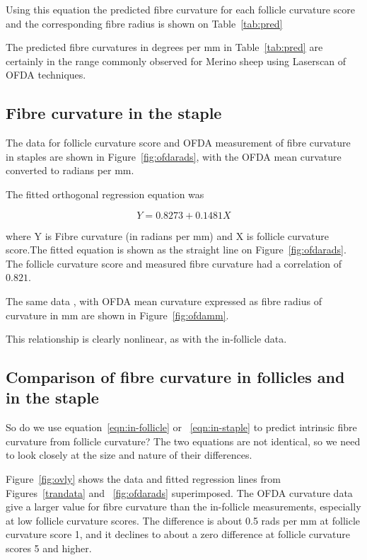\documentclass[titlepage]{article}  %
\begin{document}
Using this equation the predicted fibre curvature for each follicle curvature score and the corresponding fibre radius is shown on Table~\ref{tab:pred}


 
The predicted fibre curvatures in  degrees per mm in Table~\ref{tab:pred} are certainly in the range commonly observed for Merino sheep using Laserscan of OFDA techniques.

\subsection{Fibre curvature in the staple}
The data for follicle curvature score and OFDA measurement of fibre curvature in staples are shown in Figure~\ref{fig:ofdarads}, with the OFDA mean curvature converted to radians per mm. 



The fitted orthogonal regression equation was 

\begin{equation}
\label{eqn:in-staple}
Y = 0.8273 + 0.1481 X
\end{equation}

where Y is Fibre curvature (in radians per mm) and X is follicle curvature score.The fitted equation is shown as the straight line on Figure~\ref{fig:ofdarads}. The follicle curvature score and measured fibre curvature  had a correlation  of $0.821$.



The same data , with OFDA mean curvature expressed as fibre radius of curvature in mm are shown in Figure~\ref{fig:ofdamm}.



This relationship is clearly nonlinear, as with the in-follicle data.

\subsection{Comparison of fibre curvature in follicles and in the staple}
So do we use equation~\ref{eqn:in-follicle} or ~\ref{eqn:in-staple} to predict intrinsic fibre curvature from follicle curvature? The two equations are not identical, so we need to look closely at the size and nature of their differences.

Figure~\ref{fig:ovly} shows the data and fitted regression lines from Figures~\ref{trandata} and ~\ref{fig:ofdarads} superimposed. The OFDA curvature data give a larger value for fibre curvature than the in-follicle measurements, especially at low follicle curvature scores. The difference is about 0.5 rads per mm at follicle curvature score 1, and it declines to about a zero difference at follicle curvature scores 5 and higher. 
\end{document}
